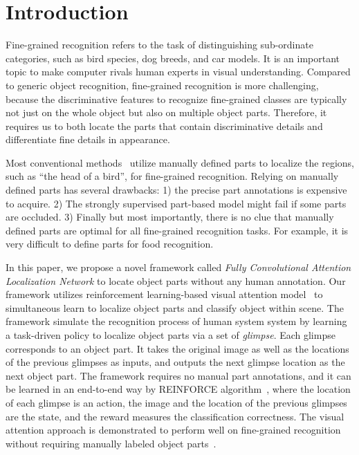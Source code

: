 \documentclass[runningheads]{llncs}
\begin{document}
\section{Introduction}
Fine-grained recognition refers to the task of distinguishing sub-ordinate categories, such as bird species, dog breeds, and car models. It is an important topic to make computer rivals human experts in visual understanding.
Compared to generic object recognition, fine-grained recognition is more challenging,
because the discriminative features to recognize fine-grained classes are typically not just on the whole object but also on multiple object parts.
Therefore, it requires us to both locate the parts that contain discriminative details and differentiate fine details in appearance.

Most conventional methods~\cite{bd10,bd15} utilize manually defined parts to localize the regions, such as ``the head of a bird'', for fine-grained recognition.
Relying on manually defined parts has several drawbacks: 1) the precise part annotations is expensive to acquire.
2) The strongly supervised part-based model might fail if some parts are occluded.
3) Finally but most importantly, there is no clue that manually defined parts are optimal for all  fine-grained recognition tasks.
For example, it is very difficult to define parts for food recognition.


In this paper, we propose a novel framework called {\em Fully Convolutional Attention Localization Network} to locate object parts without any human annotation.
Our framework utilizes reinforcement learning-based visual attention model~\cite{bd1,bd3} to simultaneous learn to localize object parts and classify object within scene.
The framework simulate the recognition process of human system system by learning a task-driven policy to localize object parts via a set of {\em glimpse}.
Each glimpse corresponds to an object part.
It takes the original image as well as the locations of the previous glimpses as inputs, and outputs the next glimpse location as the next object part.
The framework requires no manual part annotations, and it can be learned in an end-to-end way by REINFORCE algorithm~\cite{bd20}, where the location of each glimpse is an action,
the image and the location of the previous glimpses are the state, and the reward measures the classification correctness.
The visual attention approach is demonstrated to perform well on fine-grained recognition without requiring manually labeled object parts~\cite{bd3}.
\end{document}
